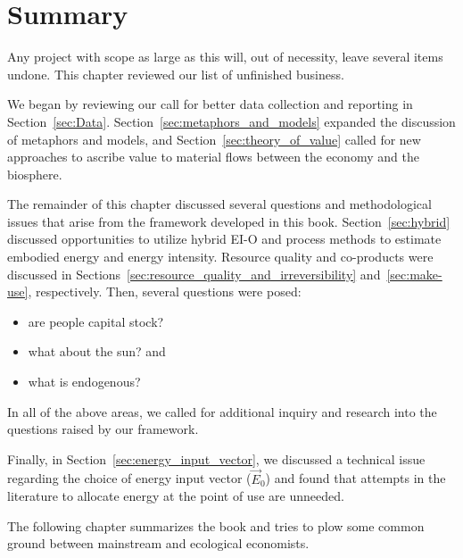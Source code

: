 \section{Summary}
\label{sec:unfinished_summary}

Any project with scope as large as this will, out of necessity, leave
several items undone.
This chapter reviewed our list of unfinished business.

We began by reviewing our call for better data collection and reporting
in Section~\ref{sec:Data}.
Section~\ref{sec:metaphors_and_models} 
expanded the discussion of metaphors and models, and 
Section~\ref{sec:theory_of_value} called for new approaches
to ascribe value to material flows between the economy and the biosphere.

The remainder of this chapter discussed several questions
and methodological issues that arise from the framework
developed in this book.
Section~\ref{sec:hybrid} discussed opportunities to utilize hybrid EI-O and process methods
to estimate embodied energy and energy intensity.
Resource quality and co-products were discussed 
in Sections~\ref{sec:resource_quality_and_irreversibility}
and~\ref{sec:make-use}, respectively.
Then, several questions were posed:
\begin{itemize}
	\item{are people capital stock?}
	
	\item{what about the sun? and}
	
	\item{what is endogenous?}
\end{itemize}

\noindent{}In all of the above areas, we called for additional 
inquiry and research 
into the questions raised by our framework.

Finally, in Section~\ref{sec:energy_input_vector}, we discussed a technical issue
regarding the choice of energy input vector ($\vec{E}_{0}$) 
and found that attempts in the literature to allocate energy
at the point of use are unneeded.

The following chapter summarizes the book 
and tries to plow some common ground
between mainstream and ecological economists.







